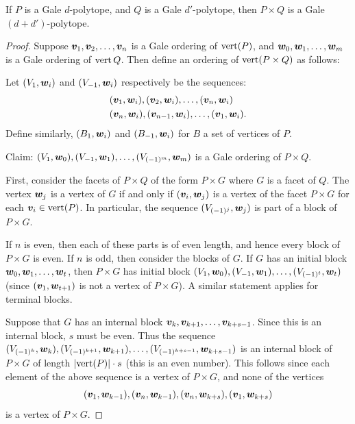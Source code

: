\begin{Theorem}\label{Thm:GaleProduct}
    If \(P\) is a Gale \(d\)-polytope, and \(Q\) is a Gale \(d'\)-polytope, then \(P\times Q\) is a Gale \((d+d')\)-polytope.
\end{Theorem}

\begin{proof}
Suppose \(\bm{v}_1,\bm{v}_2,\dotsc, \bm{v}_n\) is a Gale ordering of \(\operatorname{vert}(P)\), and \(\bm{w}_0,\bm{w}_1,\dotsc, \bm{w}_m\) is a Gale ordering of \(\operatorname{vert} Q\).  Then define an ordering of \(\operatorname{vert}(P\times Q)\) as follows:

Let \((V_1,\bm{w}_i)\) and \((V_{-1},\bm{w}_i)\) respectively be the sequences:
    \begin{align*}
        &(\bm{v}_1,\bm{w}_i),(\bm{v}_2,\bm{w}_i),\dotsc,(\bm{v}_n,\bm{w}_i)\\
        &(\bm{v}_n,\bm{w}_i),(\bm{v}_{n-1},\bm{w}_i),\dotsc,(\bm{v}_1,\bm{w}_i).
    \end{align*}
Define similarly, \((B_1,\bm{w}_i)\) and \((B_{-1},\bm{w}_i)\) for \(B\) a set of vertices of \(P\).

Claim: \((V_1,\bm{w}_0),(V_{-1},\bm{w}_1),\dotsc,(V_{(-1)^m},\bm{w}_m)\) is a Gale ordering of \(P\times Q\).

First, consider the facets of \(P\times Q\) of the form \(P\times G\) where \(G\) is a facet of \(Q\).  The vertex \(\bm{w}_j\) is a vertex of \(G\) if and only if \((\bm{v}_i, \bm{w}_j)\) is a vertex of the facet \(P\times G\) for each \(\bm{v}_i\in\operatorname{vert}(P)\).  In particular, the sequence \((V_{(-1)^j},\bm{w}_j)\) is part of a block of \(P\times G\).

If \(n\) is even, then each of these parts is of even length, and hence every block of \(P\times G\) is even.  If \(n\) is odd, then consider the blocks of \(G\).  If \(G\) has an initial block \(\bm{w}_0,\bm{w}_1,\dotsc, \bm{w}_t\), then \(P\times G\) has initial block \((V_1,\bm{w}_0),(V_{-1},\bm{w}_1),\dotsc, (V_{(-1)^t},\bm{w}_t)\) (since \((\bm{v}_1,\bm{w}_{t+1})\) is not a vertex of \(P\times G\)).  A similar statement applies for terminal blocks.

Suppose that \(G\) has an internal block \(\bm{v}_k,\bm{v}_{k+1},\dotsc,\bm{v}_{k+s-1}\).  Since this is an internal block, \(s\) must be even.  Thus the sequence \((V_{(-1)^k},\bm{w}_k),(V_{(-1)^{k+1}},\bm{w}_{k+1}),\dotsc,(V_{(-1)^{k+s-1}},\bm{w}_{k+s-1})\) is an internal block of \(P\times G\) of length \(\left\lvert\operatorname{vert}(P)\right\rvert\cdot s\) (this is an even number).  This follows since each element of the above sequence is a vertex of \(P\times G\), and none of the vertices
    \[
        (\bm{v}_1,\bm{w}_{k-1}), (\bm{v}_n,\bm{w}_{k-1}), (\bm{v}_n,\bm{w}_{k+s}), (\bm{v}_1,\bm{w}_{k+s})
    \]
is a vertex of \(P\times G\).


\end{proof}
